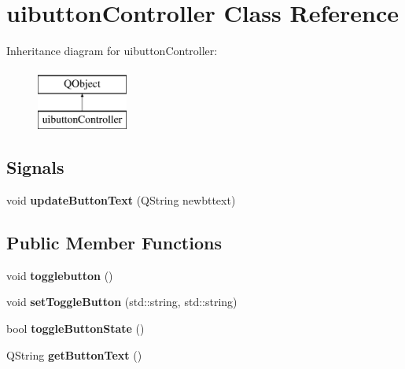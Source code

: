 \hypertarget{classuibutton_controller}{}\section{uibutton\+Controller Class Reference}
\label{classuibutton_controller}
Inheritance diagram for uibutton\+Controller\+:\begin{figure}[H]
\begin{center}
\leavevmode
\includegraphics[height=2.000000cm]{classuibutton_controller}
\end{center}
\end{figure}
\subsection*{Signals}
\begin{DoxyCompactItemize}
\item 
\mbox{\label{classuibutton_controller_aac924016f4433deafe72760a4efb7ba0}} 
void {\bfseries update\+Button\+Text} (Q\+String newbttext)
\end{DoxyCompactItemize}
\subsection*{Public Member Functions}
\begin{DoxyCompactItemize}
\item 
\mbox{\label{classuibutton_controller_a6077248f903820ebe9394cd964a862c8}} 
void {\bfseries togglebutton} ()
\item 
\mbox{\label{classuibutton_controller_a171003be8268011d4059f352ff909d35}} 
void {\bfseries set\+Toggle\+Button} (std\+::string, std\+::string)
\item 
\mbox{\label{classuibutton_controller_a839c7618a4bc9b04abed7dc6b3eef3f8}} 
bool {\bfseries toggle\+Button\+State} ()
\item 
\mbox{\label{classuibutton_controller_abab829a0ae35d3088d873f9ac15ef866}} 
Q\+String {\bfseries get\+Button\+Text} ()
\end{DoxyCompactItemize}
